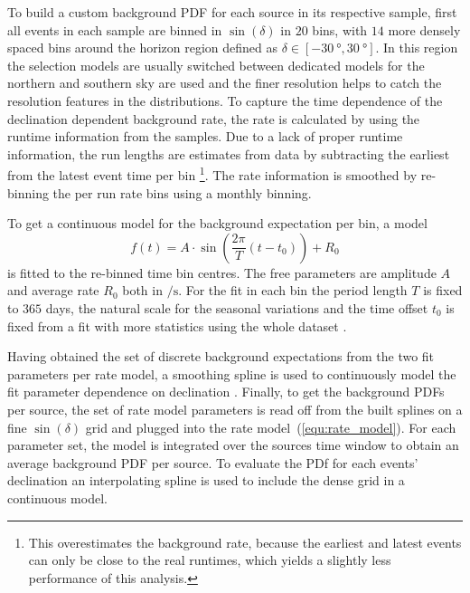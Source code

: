 To build a custom background PDF for each source in its respective sample, first all events in each sample are binned in $\sin(\delta)$ in $\num{20}$ bins, with $\num{14}$ more densely spaced bins around the horizon region defined as $\delta\in[\SI{-30}{\degree}, \SI{30}{\degree}]$.
In this region the selection models are usually switched between dedicated models for the northern and southern sky are used and the finer resolution helps to catch the resolution features in the distributions.
To capture the time dependence of the declination dependent background rate, the rate is calculated by using the runtime information from the samples.
Due to a lack of proper runtime information, the run lengths are estimates from data by subtracting the earliest from the latest event time per bin \footnote{This overestimates the background rate, because the earliest and latest events can only be close to the real runtimes, which yields a slightly less performance of this analysis.}.
The rate information is smoothed by re-binning the per run rate bins using a monthly binning.

To get a continuous model for the background expectation per bin, a model
\begin{equation}
  \label{equ:rate_model}
  f(t)
  = A\cdot
    \sin\left(\frac{2\pi}{T}\left(t - t_0\right)\right) + R_0
\end{equation}
is fitted to the re-binned time bin centres.
The free parameters are amplitude $A$ and average rate $R_0$ both in $\si{\per\s}$.
For the fit in each bin the period length $T$ is fixed to $365$ days, the natural scale for the seasonal variations and the time offset $t_0$ is fixed from a fit with more statistics using the whole dataset .

Having obtained the set of discrete background expectations from the two fit parameters per rate model, a smoothing spline is used to continuously model the fit parameter dependence on declination .
Finally, to get the background PDFs per source, the set of rate model parameters is read off from the built splines on a fine $\sin(\delta)$ grid and plugged into the rate model~(\ref{equ:rate_model}).
For each parameter set, the model is integrated over the sources time window to obtain an average background PDF per source.
To evaluate the PDf for each events' declination an interpolating spline is used to include the dense grid in a continuous model.

